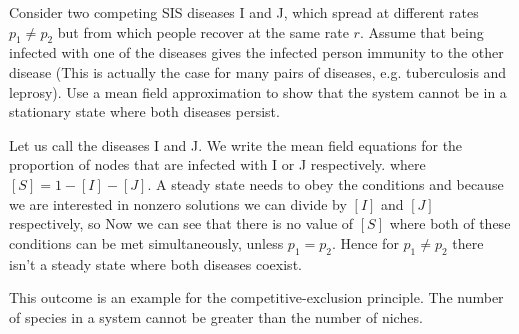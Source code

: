 Consider two competing SIS diseases I and J, which spread at different rates $p_1\neq p_2$ but from which people recover at the same rate $r$. Assume that being infected with one of the diseases gives the infected person immunity to the other disease (This is actually the case for many pairs of diseases, e.g. tuberculosis and leprosy). Use a mean field approximation to show that the system cannot be in a stationary state where both diseases persist.  

\solution
Let us call  the diseases I and J. We write the mean field equations for the proportion of nodes that are infected with I or J respectively.
where $[S]=1-[I]-[J]$. A steady state needs to obey the conditions
and because we are interested in nonzero solutions we can divide by $[I]$ and $[J]$ respectively, so 
Now we can see that there is no value of $[S]$ where both of these conditions can be met simultaneously, unless $p_1=p_2$. Hence for $p_1\neq p_2$ there isn't a steady state where both diseases coexist. 

This outcome is an example for the competitive-exclusion principle. The number of species in a system cannot be greater than the number of niches. 
